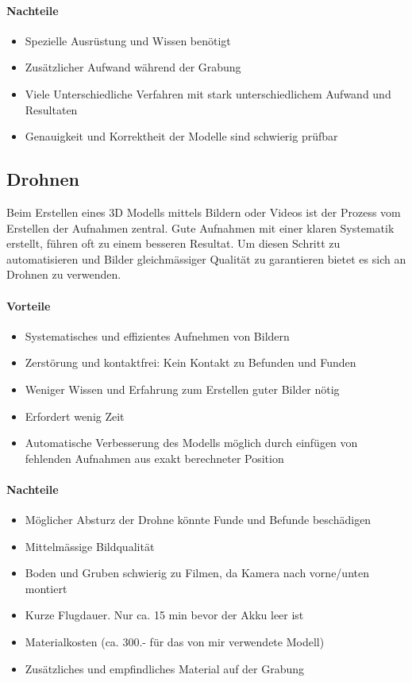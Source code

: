 \documentclass{paper}
\begin{document}
			\paragraph{Nachteile}
			\begin{itemize}
				\item
					Spezielle Ausrüstung und Wissen benötigt
				\item
					Zusätzlicher Aufwand während der Grabung
				\item
					Viele Unterschiedliche Verfahren mit stark unterschiedlichem Aufwand und Resultaten
				\item
					Genauigkeit und Korrektheit der Modelle sind schwierig prüfbar
			\end{itemize}
			
		\subsection{Drohnen}
			Beim Erstellen eines 3D Modells mittels Bildern oder Videos ist der Prozess vom Erstellen der Aufnahmen zentral. Gute Aufnahmen mit einer klaren Systematik erstellt, führen oft zu einem besseren Resultat.
			Um diesen Schritt zu automatisieren und Bilder gleichmässiger Qualität zu garantieren bietet es sich an Drohnen zu verwenden.
			
			\paragraph{Vorteile}
			\begin{itemize}
				\item
					Systematisches und effizientes Aufnehmen von Bildern
				\item
					Zerstörung und kontaktfrei: Kein Kontakt zu Befunden und Funden
				\item
					Weniger Wissen und Erfahrung zum Erstellen guter Bilder nötig
				\item
					Erfordert wenig Zeit
				\item
					Automatische Verbesserung des Modells möglich durch einfügen von fehlenden Aufnahmen aus exakt berechneter Position
			\end{itemize}
			
			\paragraph{Nachteile}
			\begin{itemize}
				\item
					Möglicher Absturz der Drohne könnte Funde und Befunde beschädigen
				\item
					Mittelmässige Bildqualität
				\item
					Boden und Gruben schwierig zu Filmen, da Kamera nach vorne/unten montiert
				\item
					Kurze Flugdauer. Nur ca. 15 min bevor der Akku leer ist
				\item
					Materialkosten (ca. 300.- für das von mir verwendete Modell)
				\item
					Zusätzliches und empfindliches Material auf der Grabung
			\end{itemize}
			
\end{document}
